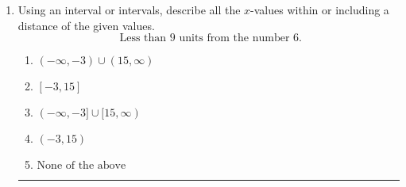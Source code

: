\documentclass[14pt]{extbook}
\newcommand{\litem}[1]{\item#1\hspace*{-1cm}\rule{\textwidth}{0.4pt}}
\begin{document}
\begin{enumerate}
{\begin{enumerate}[label=\Alph*.]
\end{enumerate} }
\litem{
Using an interval or intervals, describe all the $x$-values within or including a distance of the given values.\[ \text{ Less than } 9 \text{ units from the number } 6. \]\begin{enumerate}[label=\Alph*.]
\item \( (-\infty, -3) \cup (15, \infty) \)
\item \( [-3, 15] \)
\item \( (-\infty, -3] \cup [15, \infty) \)
\item \( (-3, 15) \)
\item \( \text{None of the above} \)

\end{enumerate} }
\end{enumerate}
\end{document}
